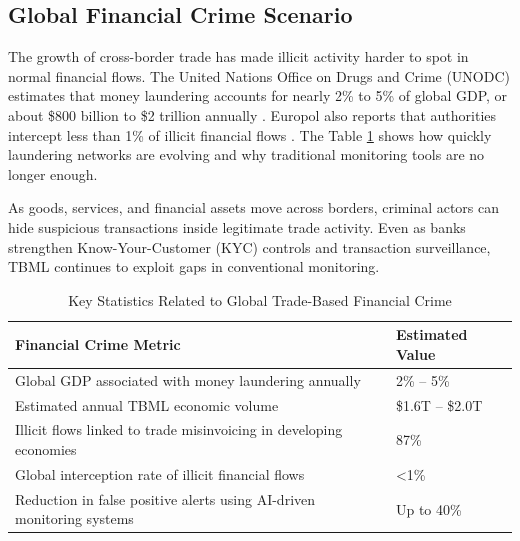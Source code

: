 \subsection[Global Financial Crime Scenario]{\textbf{Global Financial Crime Scenario}}

The growth of cross-border trade has made illicit activity harder to spot in normal financial flows. The United Nations Office on Drugs and Crime (UNODC) estimates that money laundering accounts for nearly 2\% to 5\% of global GDP, or about \$800 billion to \$2 trillion annually \cite{unodc_ml_overview}. Europol also reports that authorities intercept less than 1\% of illicit financial flows \cite{europol_financial_crime}. The Table \ref{tab:tbml_stats} shows how quickly laundering networks are evolving and why traditional monitoring tools are no longer enough.

As goods, services, and financial assets move across borders, criminal actors can hide suspicious transactions inside legitimate trade activity. Even as banks strengthen Know-Your-Customer (KYC) controls and transaction surveillance, TBML continues to exploit gaps in conventional monitoring.

\begin{table}[H]
\centering
\caption{Key Statistics Related to Global Trade-Based Financial Crime}
\label{tab:tbml_stats}

\renewcommand{\arraystretch}{1.3}
\vspace{0.2cm}

\begin{tabular}{p{10cm} p{3cm}}
\toprule

\textbf{Financial Crime Metric} & \textbf{Estimated Value} \\

\midrule

Global GDP associated with money laundering annually & 2\% -- 5\% \\

Estimated annual TBML economic volume & \$1.6T -- \$2.0T \\

Illicit flows linked to trade misinvoicing in developing economies & 87\% \\

Global interception rate of illicit financial flows & \textless 1\% \\

Reduction in false positive alerts using AI-driven monitoring systems & Up to 40\% \\

\bottomrule

\end{tabular}

\end{table}

